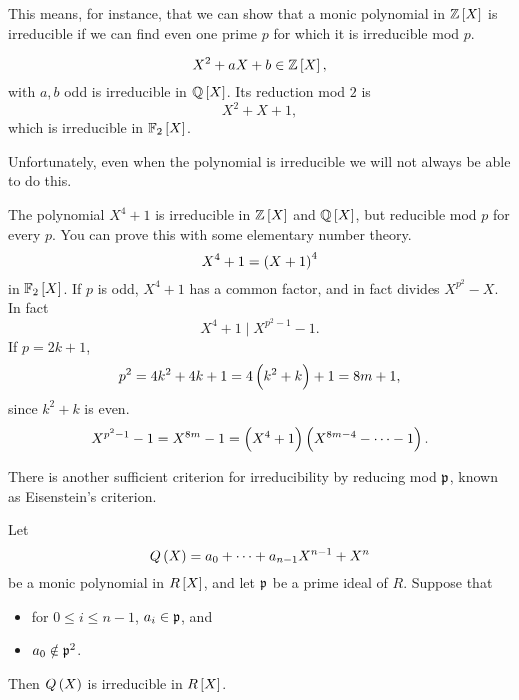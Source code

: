 This means, for instance, that we can show that a monic polynomial in $ \Z\sbr{X} $ is irreducible if we can find even one prime $ p $ for which it is irreducible mod $ p $.

\begin{example*}
$$ X^2 + aX + b \in \Z\sbr{X}, $$
with $ a, b $ odd is irreducible in $ \Q\sbr{X} $. Its reduction mod $ 2 $ is
$$ X^2 + X + 1, $$
which is irreducible in $ \F_2\sbr{X} $.
\end{example*}

Unfortunately, even when the polynomial is irreducible we will not always be able to do this.

\begin{example*}
The polynomial $ X^4 + 1 $ is irreducible in $ \Z\sbr{X} $ and $ \Q\sbr{X} $, but reducible mod $ p $ for every $ p $. You can prove this with some elementary number theory.
$$ X^4 + 1 = \br{X + 1}^4 $$
in $ \F_2\sbr{X} $. If $ p $ is odd, $ X^4 + 1 $ has a common factor, and in fact divides $ X^{p^2} - X $. In fact
$$ X^4 + 1 \mid X^{p^2 - 1} - 1. $$
If $ p = 2k + 1 $,
$$ p^2 = 4k^2 + 4k + 1 = 4\br{k^2 + k} + 1 = 8m + 1, $$
since $ k^2 + k $ is even.
$$ X^{p^2 - 1} - 1 = X^{8m} - 1 = \br{X^4 + 1}\br{X^{8m - 4} - \dots - 1}. $$
\end{example*}

There is another sufficient criterion for irreducibility by reducing mod $ \mathfrak{p} $, known as Eisenstein's criterion.

\begin{proposition}
Let
$$ Q\br{X} = a_0 + \dots + a_{n - 1}X^{n - 1} + X^n $$
be a monic polynomial in $ R\sbr{X} $, and let $ \mathfrak{p} $ be a prime ideal of $ R $. Suppose that
\begin{itemize}
\item for $ 0 \le i \le n - 1 $, $ a_i \in \mathfrak{p} $, and
\item $ a_0 \notin \mathfrak{p}^2 $.
\end{itemize}
Then $ Q\br{X} $ is irreducible in $ R\sbr{X} $.
\end{proposition}

\pagebreak

